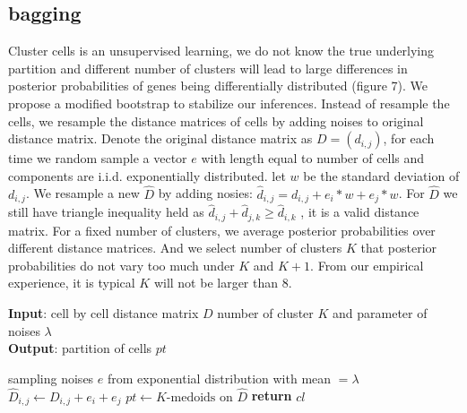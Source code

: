 \documentclass[11pt]{amsart}
\begin{document}
\subsection{bagging}
Cluster cells is an unsupervised learning, we do not know the true underlying partition and different number of clusters will lead to large differences in posterior probabilities of genes being differentially distributed (figure 7). We propose a modified bootstrap to stabilize our inferences. Instead of resample the cells, we resample the distance matrices of cells by adding noises to original distance matrix. Denote the original distance matrix as $D = (d_{i,j})$, for each time we random sample a vector $e$ with length equal to number of cells and components are i.i.d. exponentially distributed. let $w$ be the standard deviation of $d_{i,j}$. We resample a new $\hat{D}$ by adding nosies: $\hat{d}_{i,j} = d_{i,j} + e_i * w + e_j *w$. For $\hat{D}$ we still have triangle inequality held as $\hat{d}_{i,j} + \hat{d}_{j,k} \geq \hat{d}_{i,k}$ , it is a valid distance matrix. For a fixed number of clusters, we average posterior probabilities over different distance matrices. And we select number of clusters $K$ that posterior probabilities do not vary too much under $K$ and $K+1$. From our empirical experience, it is typical $K$ will not be larger than 8.\\
\begin{algorithm}
\caption{}\label{alg:generate-clustering}
\raggedright\hspace*{\algorithmicindent} \textbf{Input}: cell by cell distance matrix $D$ number of cluster $K$ and parameter of noises  $\lambda$ \\
\hspace*{\algorithmicindent} \textbf{Output}: partition of cells $pt$
\begin{algorithmic}[1]
\State sampling noises $e$ from exponential distribution with mean $= \lambda$ 
\State $\hat{D}_{i,j}\gets D_{i,j} + e_i + e_j$ 
\State $pt\gets K\text{-medoids on }\hat{D}$
\State \textbf{return} $cl$
\EndProcedure
\end{algorithmic}
\end{algorithm}
\end{document}
